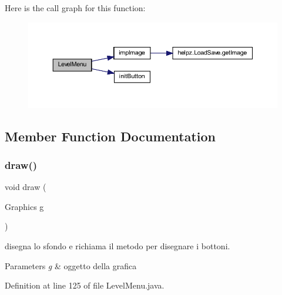 Here is the call graph for this function\+:\nopagebreak
\begin{figure}[H]
\begin{center}
\leavevmode
\includegraphics[width=350pt]{classui_1_1_level_menu_a08d3dc37d2a120ac517986d021c999c0_cgraph}
\end{center}
\end{figure}


\subsection{Member Function Documentation}
\mbox{\label{classui_1_1_level_menu_a72fe1ffca978e99fd16994a10e7f8051}} 
\subsubsection{\texorpdfstring{draw()}{draw()}}
{\footnotesize\ttfamily void draw (\begin{DoxyParamCaption}\item[{Graphics}]{g }\end{DoxyParamCaption})}



disegna lo sfondo e richiama il metodo per disegnare i bottoni. 


\begin{DoxyParams}{Parameters}
{\em g} & oggetto della grafica \\
\hline
\end{DoxyParams}


Definition at line 125 of file Level\+Menu.\+java.

